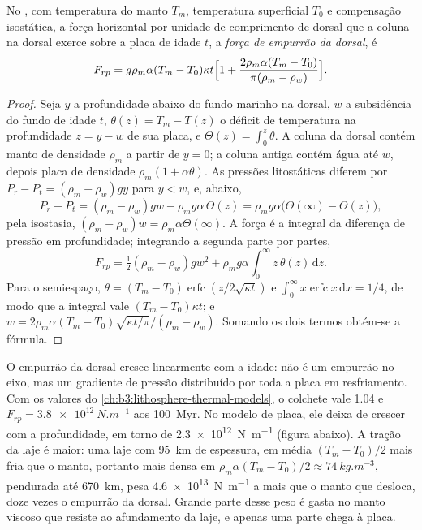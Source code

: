 \begin{proposition}\label{prop:b3:mantle-convection:ridge-push}
No , com temperatura do manto $T_m$, temperatura superficial $T_0$ e
compensação isostática, a força horizontal por unidade de comprimento de dorsal que a coluna
na dorsal exerce sobre a placa de idade $t$,
a \emph{força de empurrão da dorsal}, é
\[
  F_{rp} = g\rho_m\alpha(T_m - T_0)\kappa t\Bigl[1 + \frac{2\rho_m\alpha(T_m
  - T_0)}{\pi(\rho_m - \rho_w)}\Bigr].
\]
\end{proposition}

\begin{proof}
Seja $y$ a profundidade abaixo do fundo marinho na dorsal, $w$ a subsidência do
fundo de idade $t$, $\theta(z) = T_m - T(z)$ o déficit de temperatura na
profundidade $z = y - w$ de sua placa, e $\Theta(z) = \int_0^z\theta$. A coluna da dorsal
contém manto de densidade $\rho_m$ a partir de $y = 0$; a coluna antiga contém
água até $w$, depois placa de densidade $\rho_m(1 + \alpha\theta)$. As pressões
litostáticas diferem por $P_r - P_t = (\rho_m - \rho_w)gy$ para $y < w$,
e, abaixo,
\[
  P_r - P_t = (\rho_m - \rho_w)gw - \rho_mg\alpha\,\Theta(z)
  = \rho_mg\alpha\bigl(\Theta(\infty) - \Theta(z)\bigr),
\]
pela isostasia, $(\rho_m - \rho_w)w = \rho_m\alpha\Theta(\infty)$. A força é a
integral da diferença de pressão em profundidade; integrando a segunda parte por
partes,
\[
  F_{rp} = \tfrac12(\rho_m - \rho_w)gw^2 + \rho_mg\alpha\int_0^\infty
  z\,\theta(z)\,\mathrm dz .
\]
Para o semiespaço, $\theta = (T_m - T_0)\operatorname{erfc}(z/2\sqrt{\kappa
t})$ e $\int_0^\infty x\operatorname{erfc}x\,\mathrm dx = 1/4$, de modo que a
integral vale $(T_m - T_0)\kappa t$; e $w = 2\rho_m\alpha(T_m -
T_0)\sqrt{\kappa t/\pi}/(\rho_m - \rho_w)$. Somando os dois termos obtém-se a
fórmula.
\end{proof}

O empurrão da dorsal cresce linearmente com a idade: não é um empurrão no eixo, mas um
gradiente de pressão distribuído por toda a placa em resfriamento. Com os valores do
\cref{ch:b3:lithosphere-thermal-models}, o colchete vale 1.04 e $F_{rp} =
\qty{3.8e12}{N.m^{-1}}$ aos \qty{100}{Myr}. No modelo de placa, ele deixa de crescer
com a profundidade, em torno de \qty{2.3e12}{N.m^{-1}} (figura abaixo). A tração da laje é
maior: uma laje com \qty{95}{km} de espessura, em média $(T_m - T_0)/2$ mais fria que o
manto, portanto mais densa em $\rho_m\alpha(T_m - T_0)/2 \approx
\qty{74}{kg.m^{-3}}$, pendurada até \qty{670}{km}, pesa
\qty{4.6e13}{N.m^{-1}} a mais que o manto que desloca, doze vezes o
empurrão da dorsal. Grande parte desse peso é gasta no manto viscoso que resiste ao
afundamento da laje, e apenas uma parte chega à placa.

